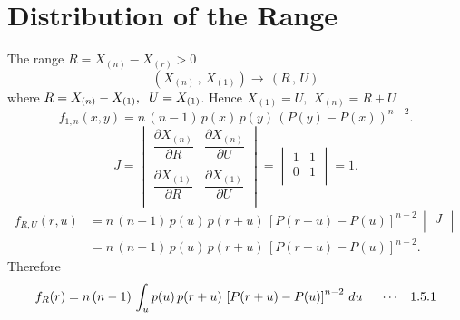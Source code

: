 \documentclass[12pt,a4paper]{report}
\theoremstyle{definition}
\theoremstyle{plain}
\begin{document}
\section{Distribution of the Range}
The range $R = X_{(n)} - X_{(r)} > 0$ $$\left(X_{(n)}\, , \, X_{(1)}\right)\longrightarrow\, \left(R\, , \, U\right)$$
where $R = X_{(n)} - X_{(1)}, \hspace{0.2cm} U = X_{(1)}$. Hence $X_{(1)} = U, \, \, X_{(n)}  = R + U$
$$f_{1, n}(x,y) = n\, (n - 1)\, p(x) \, p(y)\, \left(P(y) - P(x)\right)^{n - 2}.$$
$$J = \begin{vmatrix}
\dfrac{\partial X_{(n)}}{\partial R} & \dfrac{\partial X_{(n)}}{\partial U}\\\\
\dfrac{\partial X_{(1)}}{\partial R} & \dfrac{\partial X_{(1)}}{\partial U}\\
\end{vmatrix} 
 = \begin{vmatrix}
 1 & 1 \\
 0 & 1\\
 \end{vmatrix} = 1.$$
\begin{align*}
f_{R,U}(r,u) & = n\, (n - 1)\, p(u)\, p(r + u)\, \left[P(r + u)  - P(u)\right]^{n - 2}\, \begin{vmatrix}
J\\
\end{vmatrix}\\
& = n\, (n - 1)\, p(u)\, p(r + u)\, \left[P(r + u) - P(u)\right]^{n - 2}.
\end{align*}
Therefore
$$f_R(r) = n\, (n - 1)\, \int_{u}p(u)\, p(r  + u)\, \left[P(r + u) - P(u)\right]^{n - 2}\, du\hspace{0.5cm}\cdots\hspace{0.3cm} 1.5.1$$
\end{document}

